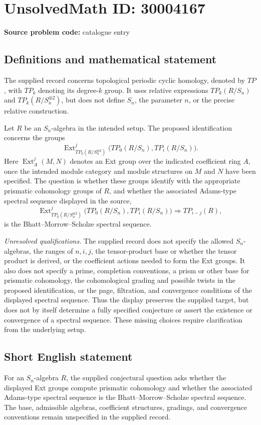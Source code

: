 \documentclass[11pt]{article}
\begin{document}
\section*{UnsolvedMath ID: 30004167}
\textbf{Source problem code:} catalogue entry
\subsection{Definitions and mathematical statement}
The supplied record concerns topological periodic cyclic homology, denoted by \(TP\), with \(TP_k\) denoting its degree-\(k\) group. It uses relative expressions \(TP_k(R/S_n)\) and \(TP_k(R/S_n^{\otimes 2})\), but does not define \(S_n\), the parameter \(n\), or the precise relative construction.

Let \(R\) be an \(S_n\)-algebra in the intended setup. The proposed identification concerns the groups
\[
\operatorname{Ext}_{TP_0(R/S_n^{\otimes 2})}^{j}
\bigl(TP_0(R/S_n),TP_i(R/S_n)\bigr).
\]
Here \(\operatorname{Ext}_A^j(M,N)\) denotes an Ext group over the indicated coefficient ring \(A\), once the intended module category and module structures on \(M\) and \(N\) have been specified. The question is whether these groups identify with the appropriate prismatic cohomology groups of \(R\), and whether the associated Adams-type spectral sequence displayed in the source,
\[
\operatorname{Ext}_{TP_0(R/S_n^{\otimes 2})}^{j}
\bigl(TP_0(R/S_n),TP_i(R/S_n)\bigr)
\Longrightarrow TP_{i-j}(R),
\]
is the Bhatt--Morrow--Scholze spectral sequence.

\emph{Unresolved qualifications.} The supplied record does not specify the allowed \(S_n\)-algebras, the ranges of \(n,i,j\), the tensor-product base or whether the tensor product is derived, or the coefficient actions needed to form the Ext groups. It also does not specify a prime, completion conventions, a prism or other base for prismatic cohomology, the cohomological grading and possible twists in the proposed identification, or the page, filtration, and convergence conditions of the displayed spectral sequence. Thus the display preserves the supplied target, but does not by itself determine a fully specified conjecture or assert the existence or convergence of a spectral sequence. These missing choices require clarification from the underlying setup.
\subsection{Short English statement}
For an \(S_n\)-algebra \(R\), the supplied conjectural question asks whether the displayed Ext groups compute prismatic cohomology and whether the associated Adams-type spectral sequence is the Bhatt--Morrow--Scholze spectral sequence. The base, admissible algebras, coefficient structures, gradings, and convergence conventions remain unspecified in the supplied record.
\end{document}
